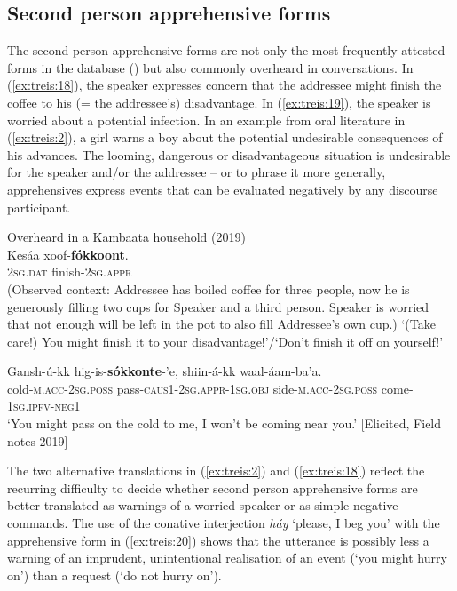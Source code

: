 \documentclass[output=paper,colorlinks,citecolor=brown,
]{langsci/langscibook}
\begin{document}
\subsection{Second person apprehensive forms}\label{sec:treis:3.3}

The second person apprehensive forms are not only the most frequently attested forms in the database () but also commonly overheard in conversations. In (\ref{ex:treis:18}), the speaker expresses concern that the addressee might finish the coffee to his (= the addressee's) disadvantage. In (\ref{ex:treis:19}), the speaker is worried about a potential infection. In an example from oral literature in (\ref{ex:treis:2}), a girl warns a boy about the potential undesirable consequences of his advances. The looming, dangerous or disadvantageous situation is undesirable for the speaker and/or the addressee -- or to phrase it more generally, apprehensives express events that can be evaluated negatively by any discourse participant.

\ea\label{ex:treis:18} \textnormal{Overheard in a Kambaata household (2019)}\\
\gll Kesáa	xoof-\textbf{fókkoont}. \\
\textsc{2sg.dat} finish-\textsc{2sg.appr}\\
\glt (Observed context: Addressee has boiled coffee for three people, now he is generously filling two cups for Speaker and a third person. Speaker is worried that not enough will be left in the pot to also fill Addressee's own cup.) `(Take care!) You might finish it to your disadvantage!'\slash `Don't finish it off on yourself!'\\
\z 

\ea\label{ex:treis:19} 
\gll Gansh-ú-kk 			hig-is-\textbf{sókkonte}-'e, shiin-á-kk 				waal-áam-ba'a. \\ 
cold-\textsc{m.acc-2sg.poss} pass-\textsc{caus1-2sg.appr-1sg.obj} side-\textsc{m.acc-2sg.poss} 	come-\textsc{1sg.ipfv-neg1}\\
\glt `You might pass on the cold to me, I won't be coming near you.' [Elicited, Field notes 2019]
\z 

 The two alternative translations in (\ref{ex:treis:2}) and (\ref{ex:treis:18}) reflect the recurring difficulty to decide whether second person apprehensive forms are better translated as warnings of a worried speaker or as simple negative commands. The use of the conative interjection \textit{háy} `please, I beg you' with the apprehensive form in (\ref{ex:treis:20}) shows that the utterance is possibly less a warning of an imprudent, unintentional realisation of an event (`you might hurry on') than a request (`do not hurry on').
\end{document}
